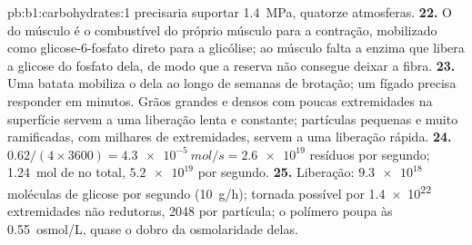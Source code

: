 \begin{solution}{pb:b1:carbohydrates:1}
precisaria suportar \qty{1.4}{MPa}, quatorze atmosferas.
\textbf{22.} O  do músculo é o combustível do próprio músculo
para a contração, mobilizado como glicose-6-fosfato direto para a
glicólise; ao músculo falta a enzima que libera a glicose do fosfato
dela, de modo que a reserva não consegue deixar a fibra.
\textbf{23.} Uma batata mobiliza o  dela ao longo de semanas de
brotação; um fígado precisa responder em minutos. Grãos grandes e densos
com poucas extremidades na superfície servem a uma liberação lenta e
constante; partículas pequenas e muito ramificadas, com milhares de
extremidades, servem a uma liberação rápida.
\textbf{24.} $0.62/(4\times 3600) = \qty{4.3e-5}{mol/s} = \num{2.6e19}$
resíduos por segundo; \qty{1.24}{mol} de  no total, $\num{5.2e19}$
por segundo.
\textbf{25.} Liberação: $\num{9.3e18}$ moléculas de glicose por segundo
(\qty{10}{g/h}); tornada possível por \num{1.4e22} extremidades não
redutoras, \num{2048} por partícula; o polímero poupa às 
\qty{0.55}{osmol/L}, quase o dobro da osmolaridade delas.
\end{solution}
